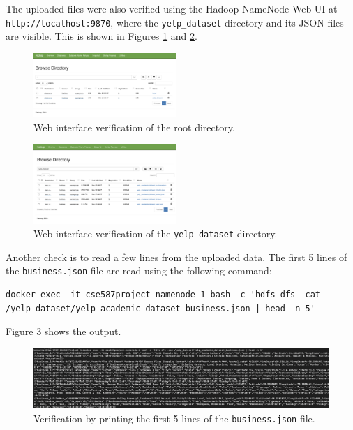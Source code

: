 \documentclass[conference]{IEEEtran}
\begin{document}
The uploaded files were also verified using the Hadoop NameNode Web UI at
\texttt{http://localhost:9870}, where the \texttt{yelp\_dataset} directory and
its JSON files are visible. This is shown in Figures \ref{fig:root_dir} and
\ref{fig:yelp_dataset_dir}.
\begin{figure}[htbp]
    \centerline{\includegraphics[width=0.48\textwidth]{graphics/root_dir.png}}
    \caption{Web interface verification of the root directory.}
    \label{fig:root_dir}
\end{figure}
\begin{figure}[htbp]
    \centerline{\includegraphics[width=0.48\textwidth]{graphics/yelp_dataset_dir.png}}
    \caption{Web interface verification of the \texttt{yelp\_dataset} directory.}
    \label{fig:yelp_dataset_dir}
\end{figure}

Another check is to read a few lines from the uploaded data. The first 5 lines
of the \texttt{business.json} file are read using the following command:
\begin{verbatim}
docker exec -it cse587project-namenode-1 bash -c 'hdfs dfs -cat /yelp_dataset/yelp_academic_dataset_business.json | head -n 5'
\end{verbatim}
Figure \ref{fig:verify_by_printing} shows the output.
\begin{figure}[htbp]
    \centerline{\includegraphics[width=1\textwidth]{graphics/verify_by_printing.png}}
    \caption{Verification by printing the first 5 lines of the \texttt{business.json}
    file.}
    \label{fig:verify_by_printing}
\end{figure}
\end{document}
